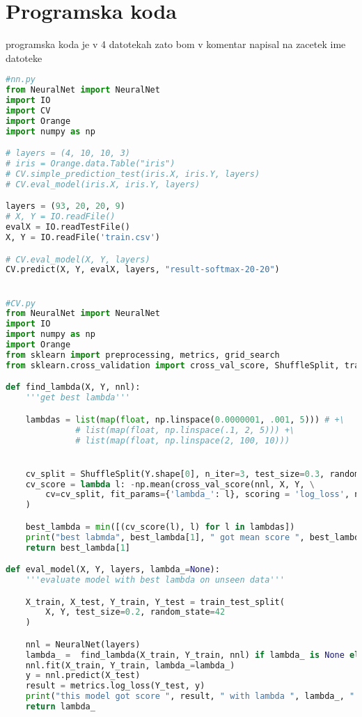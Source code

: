 \documentclass[a4paper,11pt]{article}
\begin{document}
\section{\label{app-code}Programska koda}
programska koda je v 4 datotekah zato bom v komentar napisal na zacetek ime datoteke
\begin{lstlisting}[language=Python]
#nn.py
from NeuralNet import NeuralNet
import IO
import CV
import Orange
import numpy as np

# layers = (4, 10, 10, 3)
# iris = Orange.data.Table("iris")
# CV.simple_prediction_test(iris.X, iris.Y, layers)
# CV.eval_model(iris.X, iris.Y, layers)

layers = (93, 20, 20, 9)
# X, Y = IO.readFile()
evalX = IO.readTestFile()
X, Y = IO.readFile('train.csv')

# CV.eval_model(X, Y, layers)
CV.predict(X, Y, evalX, layers, "result-softmax-20-20")


#CV.py
from NeuralNet import NeuralNet
import IO
import numpy as np
import Orange
from sklearn import preprocessing, metrics, grid_search
from sklearn.cross_validation import cross_val_score, ShuffleSplit, train_test_split

def find_lambda(X, Y, nnl):
    '''get best lambda'''

    lambdas = list(map(float, np.linspace(0.0000001, .001, 5))) # +\
              # list(map(float, np.linspace(.1, 2, 5))) +\
              # list(map(float, np.linspace(2, 100, 10)))


    cv_split = ShuffleSplit(Y.shape[0], n_iter=3, test_size=0.3, random_state=42)
    cv_score = lambda l: -np.mean(cross_val_score(nnl, X, Y, \
        cv=cv_split, fit_params={'lambda_': l}, scoring = 'log_loss', n_jobs=3)
    )

    best_lambda = min([(cv_score(l), l) for l in lambdas])
    print("best labmda", best_lambda[1], " got mean score ", best_lambda[0], " for 3 folds")
    return best_lambda[1]

def eval_model(X, Y, layers, lambda_=None):
    '''evaluate model with best lambda on unseen data'''

    X_train, X_test, Y_train, Y_test = train_test_split(
        X, Y, test_size=0.2, random_state=42
    )

    nnl = NeuralNet(layers)
    lambda_ =  find_lambda(X_train, Y_train, nnl) if lambda_ is None else lambda_
    nnl.fit(X_train, Y_train, lambda_=lambda_)
    y = nnl.predict(X_test)
    result = metrics.log_loss(Y_test, y)
    print("this model got score ", result, " with lambda ", lambda_, " and arch ", layers)
    return lambda_


\end{lstlisting}
\end{document}
